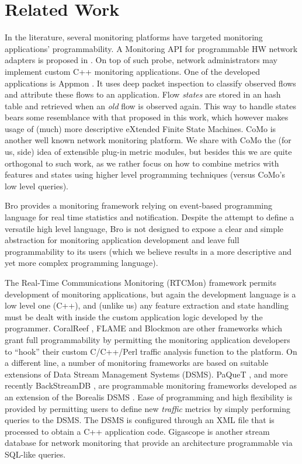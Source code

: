 \documentclass[conference,letterpaper]{sig-alternate-10pt}
\begin{document}
\section{Related Work}
In the literature, several monitoring platforms have targeted monitoring applications' programmability. 
A Monitoring API for programmable HW network adapters is proposed in \cite{trimintzios06dimapi}. 
On top of such probe, network administrators may implement custom C++ monitoring applications. 
One of the developed applications is Appmon \cite{antoniades06appmon}. It uses deep packet 
inspection to classify observed flows and attribute these flows to an application. Flow \emph{states} 
are stored in an hash table and retrieved when an \emph{old} flow is observed again. This way to 
handle states bears some resemblance with that proposed in this work, which however makes usage 
of (much) more descriptive eXtended Finite State Machines. CoMo \cite{ian04} is another well known 
network monitoring platform. We share with CoMo the (for us, side) idea of extensible plug-in metric 
modules, but besides this we are quite orthogonal to such work, as we rather focus on how to combine 
metrics with features and states using higher level programming techniques (versus CoMo's low level queries). 

Bro \cite{bro} provides a monitoring framework relying on event-based programming language for real time
 statistics and notification. Despite the attempt to define a versatile high level language, Bro is not designed 
 to expose a clear and simple abstraction for monitoring application development and leave full programmability
  to its users (which we believe results in a more descriptive and yet more complex programming language).

The Real-Time Communications Monitoring (RTCMon) framework \cite{rtcmon} permits development of 
monitoring applications, but again the development language is a low level one (C++), and (unlike us) 
any feature extraction and state handling must be dealt with inside the custom application logic developed 
by the programmer.  CoralReef \cite{keys01coralarchitecture}, FLAME \cite{flame02} and Blockmon \cite{Block12} 
are other frameworks which grant full programmability by permitting the monitoring application developers to 
``hook'' their custom C/C++/Perl traffic analysis function to the platform. 
On a different line, a number of monitoring frameworks are based on suitable extensions of Data Stream 
Management Systems (DSMS). PaQueT \cite{lig08paquet}, and more recently BackStreamDB \cite{Back12}, 
are programmable monitoring frameworks developed as an extension of the Borealis DSMS \cite{borealis05}. 
Ease of programming and high flexibility is provided by permitting users to define new \emph{traffic} metrics 
by simply performing queries to the DSMS. The DSMS is configured through an XML file that is processed to 
obtain a C++ application code. Gigascope \cite{cranor03gigascope} is another stream database for network 
monitoring that provide an architecture programmable via SQL-like queries.
\end{document}
